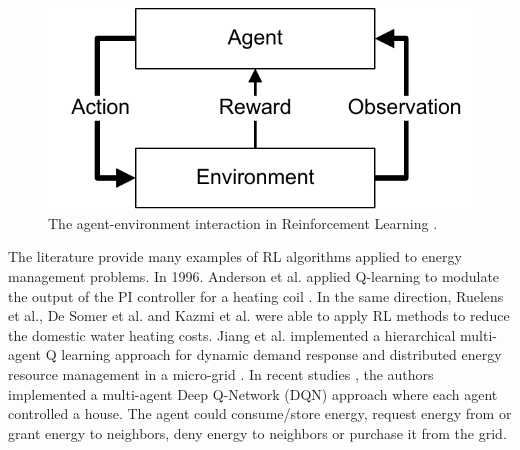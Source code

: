 %
\begin{figure}[b]
\sidecaption
\includegraphics[scale=.65]{images/Single_Agent_RL.pdf}
%
%
\caption{The agent-environment interaction in Reinforcement Learning \cite{Sutton9780262039246}.}
\label{fig:1}       %
\end{figure}

The literature provide many examples of RL algorithms applied to energy management problems. In 1996. Anderson et al. applied Q-learning to modulate the output of the PI controller for a heating coil \cite{ANDERSON1997421, Li6519950}. In the same direction, Ruelens et al.\cite{Ruelens7038106, Ruelens7792709}, De Somer et al. \cite{Somer8260152} and Kazmi et al. \cite{KAZMI2018159} were able to apply RL methods to reduce the domestic water heating costs. Jiang et al. implemented a hierarchical multi-agent Q learning approach for dynamic demand response and distributed energy resource management in a micro-grid \cite{Jiang6912013}. In recent studies \cite{ANVARIMOGHADDAM201741, prasad2018multiagent, LU2018220}, the authors implemented a multi-agent Deep Q-Network (DQN) \cite{mnih2013playing} approach where each agent controlled a house. The agent could consume/store energy, request energy from or grant energy to neighbors, deny energy to neighbors or purchase it from the grid.

